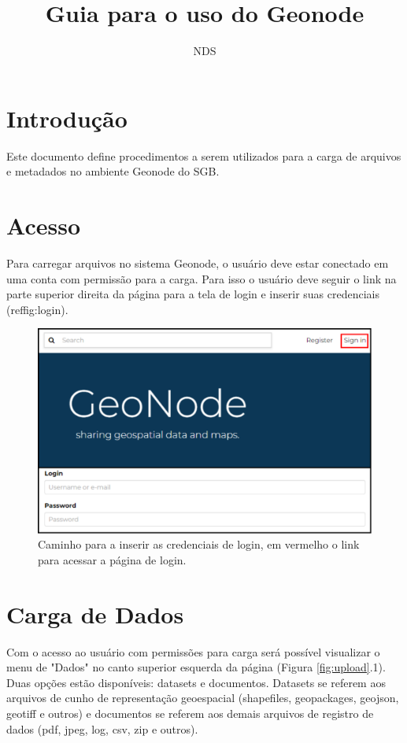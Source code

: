 \documentclass[12pt]{article}
\title{Guia para o uso do Geonode}
\author{NDS\inst{1}}
\begin{document}
 

\maketitle


\section{Introdução}

Este documento define procedimentos a serem utilizados para a carga de arquivos
e metadados no ambiente Geonode do SGB.

\section{Acesso} \label{sec:firstpage}

Para carregar arquivos no sistema Geonode, o usuário deve estar conectado em
uma conta com permissão para a carga. Para isso o usuário deve seguir o link na
parte superior direita da página para a tela de login e inserir suas
credenciais (ref{fig:login}).

\begin{figure}[h]
  \centering
  \includegraphics[width=\textwidth, keepaspectratio]{img/login.pdf}
  \caption{Caminho para a inserir as credenciais de login, em vermelho o link para acessar a página de login.}
  \label{fig:login}
\end{figure}


\section{Carga de Dados}

Com o acesso ao usuário com permissões para carga será possível visualizar o
menu de "Dados" no canto superior esquerda da página (Figura
\ref{fig:upload}.1). Duas opções estão disponíveis: datasets e documentos.
Datasets se referem aos arquivos de cunho de representação geoespacial
(shapefiles, geopackages, geojson, geotiff e outros) e documentos se referem
aos demais arquivos de registro de dados (pdf, jpeg, log, csv, zip e outros).
\end{document}
